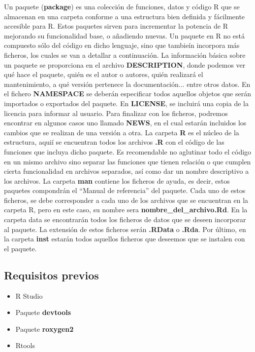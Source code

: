 Un paquete (\textbf{package}) es una colecci\'on de funciones, datos y c\'odigo R que se almacenan en una carpeta 
conforme a una estructura bien definida y f\'acilmente accesible para R.
Estos paquetes sirven para incrementar la potencia de R mejorando su funcionalidad base, o a\~nadiendo 
nuevas.
Un paquete en R no est\'a compuesto s\'olo del c\'odigo en dicho lenguaje, sino que tambie\'in incorpora m\'as ficheros, 
los cuales se van a detallar a continuaci\'on.
La informaci\'on b\'asica sobre un paquete se proporciona en el archivo \textbf{\textbf{DESCRIPTION}}, donde podemos ver qu\'e hace 
el paquete, qui\'en es el autor o autores, qui\'en realizar\'a el mantenimiento, a qu\'e versi\'on pertenece la 
documentaci\'on... entre otros datos.
En el fichero \textbf{NAMESPACE} se deber\'an especificar todos aquellos objetos que ser\'an importados o exportados del paquete.
En \textbf{LICENSE}, se incluir\'a una copia de la licencia para informar al usuario.
Para finalizar con los ficheros, podremos encontrar en algunos casos uno llamado \textbf{NEWS}, en el cual estar\'an 
incluidos los cambios que se realizan de una versi\'on a otra.
La carpeta \textbf{R} es el n\'ucleo de la estructura, aqui\'i se encuentran todos los archivos \textbf{\textbf{.R}} con el c\'odigo de las funciones que incluya dicho paquete.
Es recomendable no aglutinar todo el c\'odigo en un mismo archivo sino separar las funciones que tienen relaci\'on 
o que cumplen cierta funcionalidad en archivos separados, as\'i como dar un nombre descriptivo a los archivos.
La carpeta \textbf{man} contiene los ficheros de ayuda, es decir, estos paquetes compondr\'an el “Manual de referencia” 
del paquete. Cada uno de estos ficheros, se debe corresponder a cada uno de los archivos que se encuentran 
en la carpeta R, pero en este caso, su nombre sera \textbf{nombre\_del\_archivo\textbf{.R}d}.
En la carpeta data se encontrar\'an todos los ficheros de datos que se deseen incorporar al paquete. La extensi\'on 
de estos ficheros ser\'an \textbf{\textbf{.R}Data} o \textbf{\textbf{.R}da}.
Por \'ultimo, en la carpeta \textbf{inst} estar\'an todos aquellos ficheros que deseemos que se instalen con el paquete.


\subsection{Requisitos previos}

\begin{itemize}
    \item R Studio
    \item Paquete \textbf{devtools}
    \item Paquete \textbf{\textbf{roxygen2}} 
    \item Rtools
\end{itemize}

